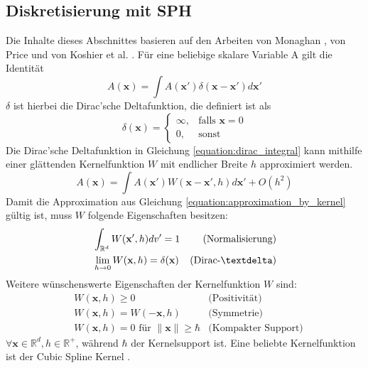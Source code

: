 \documentclass[11pt,
a4paper,
parskip=half, %
BCOR=10mm, %
english,
ngerman]{scrreprt}
\begin{document}
\subsection{Diskretisierung mit SPH}
Die Inhalte dieses Abschnittes basieren auf den Arbeiten
von Monaghan \cite{monaghan_smoothed_2005}, von Price \cite{price_smoothed_2012} und von Koshier et al. \cite{koschier_smoothed_2020}.
Für eine beliebige skalare Variable A gilt die Identität
\begin{equation}
    \label{equation:dirac_integral}
    A(\textbf{x}) = \int A(\textbf{x}') \delta(\textbf{x} - \textbf{x}') d\textbf{x}'
\end{equation}
$\delta$ ist hierbei die Dirac'sche Deltafunktion, die definiert ist als
\begin{equation}
    \delta(\textbf{x}) = \begin{cases}
        \infty, &\text{falls } \textbf{x} = 0\\
        0, &\text{sonst}
    \end{cases}
\end{equation}
Die Dirac'sche Deltafunktion in Gleichung \ref{equation:dirac_integral} kann mithilfe einer glättenden Kernelfunktion $W$ mit endlicher Breite $h$ approximiert werden.
\begin{equation}
    \label{equation:approximation_by_kernel}
    A(\textbf{x}) = \int A(\textbf{x}') W(\textbf{x} - \textbf{x}', h) d\textbf{x}' + O(h^2)
\end{equation}
Damit die Approximation aus Gleichung \ref{equation:approximation_by_kernel} gültig ist, muss $W$ folgende Eigenschaften besitzen:
\begin{align}
    &\int_{\mathbb{R}^d} W(\textbf{x}', h)dv' = 1 & \text{(Normalisierung)}\\
    &\lim_{h \to 0} W(\textbf{x}, h) = \delta(\textbf{x}) & \text{(Dirac-\textdelta)}
\end{align}
Weitere wünschenswerte Eigenschaften der Kernelfunktion $W$ sind:
\begin{align}
    &W(\textbf{x}, h) \geq 0 & \text{(Positivität)}\\
    &W(\textbf{x}, h) = W(-\textbf{x}, h) & \text{(Symmetrie)}\\
    &W(\textbf{x}, h) = 0 \text{ für } \| \textbf{x} \| \geq \hbar & \text{(Kompakter Support)}
\end{align}
$\forall \textbf{x} \in \mathbb{R}^d, h \in \mathbb{R}^+$, während $\hbar$ der Kernelsupport ist.
Eine beliebte Kernelfunktion ist der Cubic Spline Kernel \cite{monaghan_smoothed_1992}.
\end{document}
